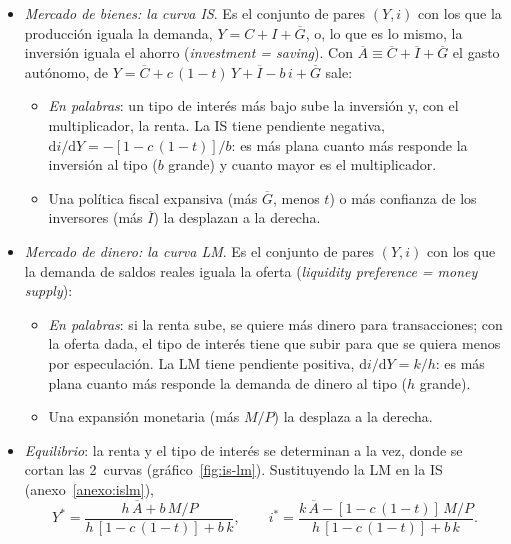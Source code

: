 \documentclass[11pt]{article}
\begin{document}
\begin{itemize}
\item \emph{Mercado de bienes: la curva IS}. Es el conjunto de pares $(Y,i)$ con los que la producción iguala la demanda, $Y=C+I+\overline{G}$, o, lo que es lo mismo, la inversión iguala el ahorro (\emph{investment = saving}). Con $\overline{A}\equiv\overline{C}+\overline{I}+\overline{G}$ el gasto autónomo, de $Y=\overline{C}+c\,(1-t)\,Y+\overline{I}-b\,i+\overline{G}$ sale:
  \begin{itemize}
  \item \emph{En palabras}: un tipo de interés más bajo sube la inversión y, con el multiplicador, la renta. La IS tiene pendiente negativa, $\mathrm{d}i/\mathrm{d}Y=-[1-c\,(1-t)]/b$: es más plana cuanto más responde la inversión al tipo ($b$ grande) y cuanto mayor es el multiplicador.
  \item Una política fiscal expansiva (más $\overline{G}$, menos $t$) o más confianza de los inversores (más $\overline{I}$) la desplazan a la derecha.
  \end{itemize}
\item \emph{Mercado de dinero: la curva LM}. Es el conjunto de pares $(Y,i)$ con los que la demanda de saldos reales iguala la oferta (\emph{liquidity preference = money supply}):
  \begin{itemize}
  \item \emph{En palabras}: si la renta sube, se quiere más dinero para transacciones; con la oferta dada, el tipo de interés tiene que subir para que se quiera menos por especulación. La LM tiene pendiente positiva, $\mathrm{d}i/\mathrm{d}Y=k/h$: es más plana cuanto más responde la demanda de dinero al tipo ($h$ grande).
  \item Una expansión monetaria (más $M/P$) la desplaza a la derecha.
  \end{itemize}
\item \emph{Equilibrio}: la renta y el tipo de interés se determinan a la vez, donde se cortan las 2~curvas (gráfico~\ref{fig:is-lm}). Sustituyendo la LM en la IS (anexo~\ref{anexo:islm}),
  \begin{equation}
  Y^*=\frac{h\,\overline{A}+b\,M/P}{h\,[1-c\,(1-t)]+b\,k},\qquad i^*=\frac{k\,\overline{A}-[1-c\,(1-t)]\,M/P}{h\,[1-c\,(1-t)]+b\,k}. \label{eq:equilibrio-islm}
  \end{equation}
\end{itemize}
\end{document}
